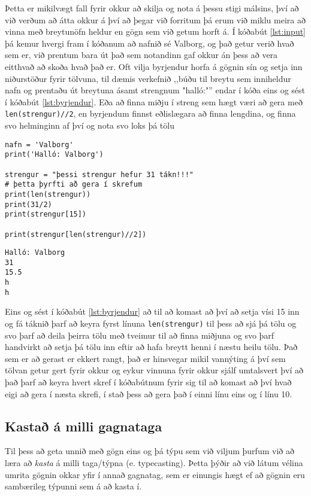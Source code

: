 Þetta er mikilvægt fall fyrir okkur að skilja og nota á þessu stigi málsins, því að við verðum að átta okkur á því að þegar við forritum þá erum við miklu meira að vinna með breytunöfn heldur en gögn sem við getum horft á.
Í kóðabút \ref{lst:input} þá kemur hvergi fram í kóðanum að nafnið sé Valborg, og það getur verið hvað sem er, við prentum bara út það sem notandinn gaf okkur án þess að vera eitthvað að skoða hvað það er.
Oft vilja byrjendur horfa á gögnin sín og setja inn niðurstöður fyrir tölvuna, til dæmis verkefnið ,,búðu til breytu sem inniheldur nafn og prentaðu út breytuna ásamt strengnum "halló:"'' endar í kóða eins og sést í kóðabút \ref{lst:byrjendur}.
Eða að finna miðju í streng sem hægt væri að gera með \texttt{len(strengur)//2}, en byrjendum finnst eðlislægara að finna lengdina, og finna svo helminginn af því og nota svo loks þá tölu

\begin{lstlisting}[caption=Oft forðast byrjendur að nota breytur og treysta meira á að sjá hvað ætti að koma út, label=lst:byrjendur]
nafn = 'Valborg'
print('Halló: Valborg')

strengur = "þessi strengur hefur 31 tákn!!!"
# þetta þyrfti að gera í skrefum
print(len(strengur)) 
print(31/2) 
print(strengur[15])

print(strengur[len(strengur)//2])
\end{lstlisting}
\lstset{style=uttak}
\begin{lstlisting}
Halló: Valborg
31
15.5
h
h
\end{lstlisting}
\lstset{style=venjulegt}

Eins og sést í kóðabút \ref{lst:byrjendur} að til að komast að því að setja vísi 15 inn og fá táknið þarf að keyra fyrst línuna \texttt{len(strengur)} til þess að sjá þá tölu og svo þarf að deila þeirra tölu með tveimur til að finna miðjuna og svo þarf handvirkt að setja þá tölu inn eftir að hafa breytt henni í næstu heilu tölu.
Það sem er að gerast er ekkert rangt, það er hinsvegar mikil vannýting á því sem tölvan getur gert fyrir okkur og eykur vinnuna fyrir okkur sjálf umtalsvert því að það þarf að keyra hvert skref í kóðabútnum fyrir sig til að komast að því hvað eigi að gera í næsta skrefi, í stað þess að gera það í einni línu eins og í línu 10.

\subsection{Kastað á milli gagnataga}
Til þess að geta unnið með gögn eins og þá týpu sem við viljum þurfum við að læra að \emph{kasta} á milli taga/týpna (e. typecasting).
Þetta þýðir að við látum vélina umrita gögnin okkar yfir í annað gagnatag, sem er einungis hægt ef að gögnin eru sambærileg týpunni sem á að kasta í.

